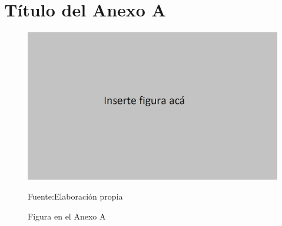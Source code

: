 \chapter{Título del Anexo A}

\begin{figure}[H]
\centering
\includegraphics[width=\linewidth]{03_anexos/00_figuras/01_figura.png} %
\caption{Figura en el Anexo A}
\centering
Fuente:Elaboración propia
\label{fig_a1_ejemplo}
\end{figure}